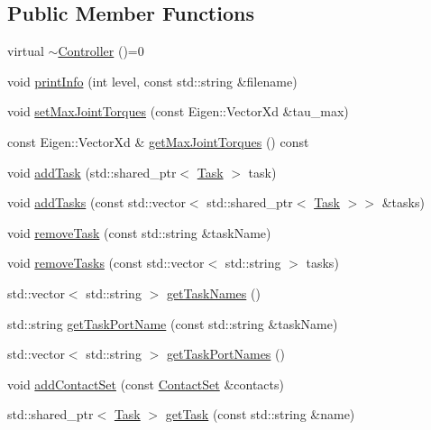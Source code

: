 \subsection*{Public Member Functions}
\begin{DoxyCompactItemize}
\item 
virtual \hyperlink{classocra_1_1Controller_a42bee636760563a73321de01ba972b6b}{$\sim$\+Controller} ()=0
\item 
void \hyperlink{classocra_1_1Controller_ad05741095a1e8f741cd3d4d67b40e239}{print\+Info} (int level, const std\+::string \&filename)
\item 
void \hyperlink{classocra_1_1Controller_a646510edd30c0fb5bc29e49917c32356}{set\+Max\+Joint\+Torques} (const Eigen\+::\+Vector\+Xd \&tau\+\_\+max)
\item 
const Eigen\+::\+Vector\+Xd \& \hyperlink{classocra_1_1Controller_a237b064c384ee45ff0a9152526c8818c}{get\+Max\+Joint\+Torques} () const
\item 
void \hyperlink{classocra_1_1Controller_a2135ac360027e8fcca02182055a7f714}{add\+Task} (std\+::shared\+\_\+ptr$<$ \hyperlink{classocra_1_1Task}{Task} $>$ task)
\item 
void \hyperlink{classocra_1_1Controller_a75755b3a9b346283e4343e15e6f83ddb}{add\+Tasks} (const std\+::vector$<$ std\+::shared\+\_\+ptr$<$ \hyperlink{classocra_1_1Task}{Task} $>$$>$ \&tasks)
\item 
void \hyperlink{classocra_1_1Controller_a0794b232fe416785b6bfb9e5e380424f}{remove\+Task} (const std\+::string \&task\+Name)
\item 
void \hyperlink{classocra_1_1Controller_ad0e1a54d26697be34348d8fb85b368d4}{remove\+Tasks} (const std\+::vector$<$ std\+::string $>$ tasks)
\item 
std\+::vector$<$ std\+::string $>$ \hyperlink{classocra_1_1Controller_abecbaf3846371383eb3c6e8b2fef031b}{get\+Task\+Names} ()
\item 
std\+::string \hyperlink{classocra_1_1Controller_ae037e3554152ec025fbb7df09fba3deb}{get\+Task\+Port\+Name} (const std\+::string \&task\+Name)
\item 
std\+::vector$<$ std\+::string $>$ \hyperlink{classocra_1_1Controller_aa18b2870c3099225050b4e95121cdd3f}{get\+Task\+Port\+Names} ()
\item 
void \hyperlink{classocra_1_1Controller_a51496c52fab832f53fe080a013f13a0e}{add\+Contact\+Set} (const \hyperlink{classocra_1_1ContactSet}{Contact\+Set} \&contacts)
\item 
std\+::shared\+\_\+ptr$<$ \hyperlink{classocra_1_1Task}{Task} $>$ \hyperlink{classocra_1_1Controller_ab5ffcbcc07bf4191d38b75ef10214acb}{get\+Task} (const std\+::string \&name)
$$
\end{DoxyCompactItemize}
